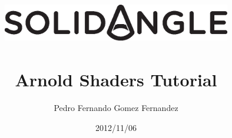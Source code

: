 \documentclass[12pt,a4paper,titlepage]{article}
\begin{document}
\renewcommand{\listingscaption}{Example}
\renewcommand{\theFancyVerbLine}{\sffamily\textcolor[rgb]{0.5,0.5,0.5}{\scriptsize\arabic{FancyVerbLine}}}

\title{\includegraphics[width=10cm]{SOLID_ANGLE_logotipo.eps}\\ \colorbox{white}{} \\ \bfseries\huge Arnold Shaders Tutorial}
\author{Pedro Fernando Gomez Fernandez}
\date{2012/11/06}
\maketitle

\tableofcontents
\newpage

\setcounter{page}{1}






\end{document}
